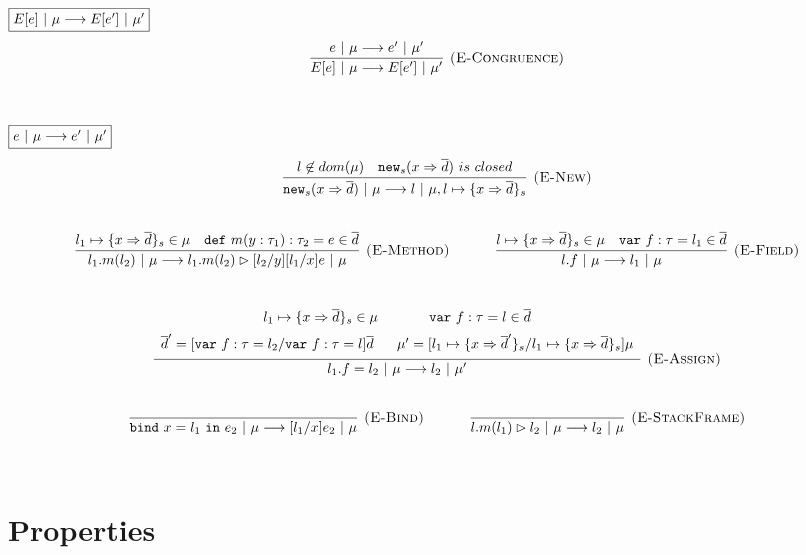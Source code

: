 \documentclass{llncs}
\newcommand{\keywadj}[1]{\mathtt{#1}}
\newcommand{\keyw}[1]{\keywadj{#1}~}
\begin{document}
$\fbox{$E[e]~|~\mu \longrightarrow E[e']~|~\mu'$}$
\[
\begin{array}{c}
\infer[\textsc{(E-Congruence)}]
  {E[e]~|~\mu \longrightarrow E[e']~|~\mu'}
  {e~|~\mu \longrightarrow e'~|~\mu'}\\[5ex]  
\end{array}
\]


$\fbox{$e~|~\mu \longrightarrow e'~|~\mu'$}$
\[
\begin{array}{c}
\infer[\textsc{(E-New)}]
  {\keywadj{new}_{s}(x \Rightarrow \overline{d})~|~\mu \longrightarrow l~|~\mu, l \mapsto \{ x \Rightarrow \overline{d} \}_{s}}
  {l \not\in dom(\mu) & \keywadj{new}_{s}(x \Rightarrow \overline{d})~is~closed}\\[5ex]

\infer[\textsc{(E-Method)}]
  {l_1.m(l_2)~|~\mu \longrightarrow l_1.m(l_2) \rhd [l_2/y][l_1/x]e~|~\mu}
  {l_1 \mapsto \{ x \Rightarrow \overline{d} \}_{s} \in \mu & \keyw{def} m(y : \tau_1) : \tau_2 = e \in \overline{d}}%
~~~~~~~~~~
\infer[\textsc{(E-Field)}]
  {l.f~|~\mu \longrightarrow l_1~|~\mu}
  {l \mapsto \{ x \Rightarrow \overline{d} \}_{s} \in \mu & \keyw{var} f:\tau = l_1 \in \overline{d}}\\[5ex]

\infer[\textsc{(E-Assign)}]
  {l_1.f = l_2~|~\mu \longrightarrow l_2~|~\mu'}
  {\def\arraystretch{1.6}
  \begin{array}{c}
l_1 \mapsto \{ x \Rightarrow \overline{d} \}_{s} \in \mu~~~~~~~~~~~\keyw{var} f:\tau = l \in \overline{d} \\
\overline{d}' = [\keyw{var} f:\tau = l_2/\keyw{var} f:\tau = l]\overline{d}~~~~~\mu' = [l_1 \mapsto \{ x \Rightarrow \overline{d}' \}_{s}/l_1 \mapsto \{ x \Rightarrow \overline{d} \}_{s}]\mu
  \end{array}}\\[5ex]

\infer[\textsc{(E-Bind)}]
  {\keyw{bind} x = l_1~\keyw{in} e_2~|~\mu \longrightarrow [l_1/x]e_2~|~\mu}
  {}%
~~~~~~~~~~
\infer[\textsc{(E-StackFrame)}]
  {l.m(l_1) \rhd l_2~|~\mu \longrightarrow l_2~|~\mu}
  {}\\[5ex]
  
\end{array}
\]

\newpage
\section{Properties}
\end{document}
